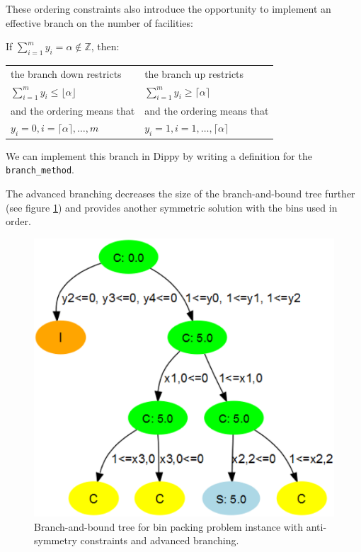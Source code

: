 These ordering constraints also introduce the opportunity to implement an effective branch on the number of facilities:

If $\displaystyle\sum_{i=1}^m y_i = \alpha \notin \mathbb{Z}$, then:
\vspace*{-6pt}
\begin{center}
\begin{tabular}{l|l}
the branch down restricts & the branch up restricts \\
$\displaystyle\sum_{i=1}^m y_i \leq \lfloor \alpha \rfloor$ &
$\displaystyle\sum_{i=1}^m y_i \geq \lceil \alpha \rceil$ \\
and the ordering means that & and the ordering means that \\
$y_i = 0, i = \lceil \alpha \rceil, \ldots, m$ &
$y_i = 1, i = 1, \ldots, \lceil \alpha \rceil$
\end{tabular}
\end{center}

\begin{sloppypar}We can implement this branch in Dippy by writing a definition for the \lstinline{branch_method}.\end{sloppypar}



The advanced branching decreases the size of the branch-and-bound tree further (see figure \ref{fig:bpp_tree3}) and provides another symmetric solution with the bins used in order.
\begin{figure}[htp]
\begin{center}
\includegraphics[scale=0.08]{img/bpp_tree3.eps}
\end{center}
\caption{Branch-and-bound tree for bin packing problem instance with anti-symmetry constraints and advanced branching.} \label{fig:bpp_tree3}
\end{figure}

